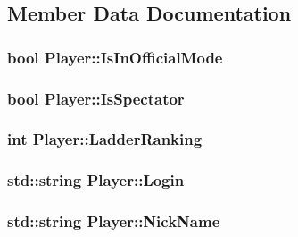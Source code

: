 \subsection{Member Data Documentation}
\hypertarget{structPlayer_a76e8b5298bcbe9ff694b6ed490ef7ca5}{
\subsubsection[{Is\-In\-Official\-Mode}]{\setlength{\rightskip}{0pt plus 5cm}bool Player\-::\-Is\-In\-Official\-Mode}}\label{structPlayer_a76e8b5298bcbe9ff694b6ed490ef7ca5}
\hypertarget{structPlayer_a61ba0e32d336f5cd1eb152addf6848d2}{
\subsubsection[{Is\-Spectator}]{\setlength{\rightskip}{0pt plus 5cm}bool Player\-::\-Is\-Spectator}}\label{structPlayer_a61ba0e32d336f5cd1eb152addf6848d2}
\hypertarget{structPlayer_a25fe69852f0e38f541ad615cd59877ef}{
\subsubsection[{Ladder\-Ranking}]{\setlength{\rightskip}{0pt plus 5cm}int Player\-::\-Ladder\-Ranking}}\label{structPlayer_a25fe69852f0e38f541ad615cd59877ef}
\hypertarget{structPlayer_a38398818d43e186aa982a788744792d7}{
\subsubsection[{Login}]{\setlength{\rightskip}{0pt plus 5cm}std\-::string Player\-::\-Login}}\label{structPlayer_a38398818d43e186aa982a788744792d7}
\hypertarget{structPlayer_a553cc1b0aa79108b511ba408210582cf}{
\subsubsection[{Nick\-Name}]{\setlength{\rightskip}{0pt plus 5cm}std\-::string Player\-::\-Nick\-Name}}\label{structPlayer_a553cc1b0aa79108b511ba408210582cf}
